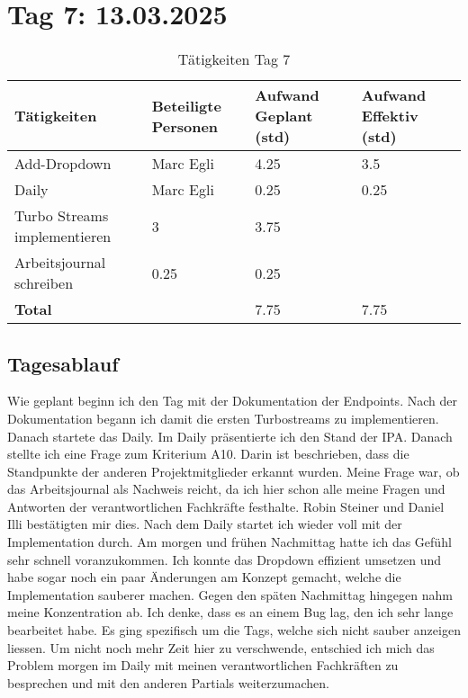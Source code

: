\section{Tag 7: 13.03.2025}
\begin{table}[H]
    \begin{tabular}{|L{0.4\textwidth}|C{60pt}|C{60pt}|C{60pt}|}
        \hline
        \color{white}Tätigkeiten & \color{white}Beteiligte \color{white}Personen & \color{white}Aufwand Geplant (std) & \color{white}Aufwand Effektiv (std) \\
        \hline
         Add-Dropdown & Marc Egli & 4.25 & 3.5 \\
        \hline
        Daily & Marc Egli & 0.25 & 0.25 \\
        \hline
        Turbo Streams implementieren & 3 & 3.75 \\
        \hline
        Arbeitsjournal schreiben & 0.25 & 0.25 \\
        \textbf{Total} &  & 7.75 & 7.75 \\
        \hline
    \end{tabular}
    \caption{Tätigkeiten Tag 7}
\end{table}

\subsection*{Tagesablauf}
Wie geplant beginn ich den Tag mit der Dokumentation der Endpoints. Nach der Dokumentation begann ich damit die ersten Turbostreams zu implementieren.
Danach startete das Daily. Im Daily präsentierte ich den Stand der IPA. Danach stellte ich eine Frage zum Kriterium A10. Darin ist beschrieben, dass die Standpunkte der
anderen Projektmitglieder erkannt wurden. Meine Frage war, ob das Arbeitsjournal als Nachweis reicht, da ich hier schon alle meine Fragen und Antworten der verantwortlichen 
Fachkräfte festhalte. Robin Steiner und Daniel Illi bestätigten mir dies. Nach dem Daily startet ich wieder voll mit der Implementation durch. 
Am morgen und frühen Nachmittag hatte ich das Gefühl sehr schnell voranzukommen. Ich konnte das Dropdown effizient umsetzen und habe sogar noch ein paar Änderungen am Konzept gemacht,
welche die Implementation sauberer machen. Gegen den späten Nachmittag hingegen nahm meine Konzentration ab. Ich denke, dass es an einem Bug lag, den ich sehr lange
bearbeitet habe. Es ging spezifisch um die Tags, welche sich nicht sauber anzeigen liessen. Um nicht noch mehr Zeit hier zu verschwende, entschied ich mich
das Problem morgen im Daily mit meinen verantwortlichen Fachkräften zu besprechen und mit den anderen Partials weiterzumachen. 

